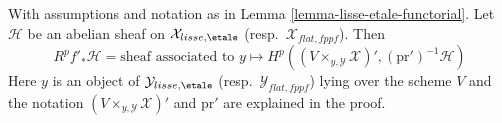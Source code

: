 \begin{lemma}
\label{lemma-lisse-etale-functorial-pushforward}
With assumptions and notation as in Lemma \ref{lemma-lisse-etale-functorial}.
Let $\mathcal{H}$  be an abelian sheaf on $\mathcal{X}_{lisse,\etale}$
(resp.\ $\mathcal{X}_{flat,fppf}$). Then
\begin{equation}
\label{equation-higher-direct-image-lisse-etale}
R^pf'_*\mathcal{H} =
\text{sheaf associated to }y \longmapsto
H^p((V \times_{y, \mathcal{Y}} \mathcal{X})', (\text{pr}')^{-1}\mathcal{H})
\end{equation}
Here $y$ is an object of $\mathcal{Y}_{lisse,\etale}$
(resp.\ $\mathcal{Y}_{flat,fppf}$) lying over the scheme $V$
and the notation $(V \times_{y, \mathcal{Y}} \mathcal{X})'$
and $\text{pr}'$ are explained in the proof.
\end{lemma}

